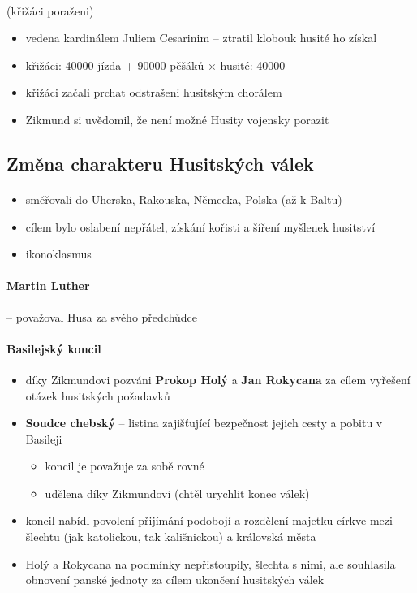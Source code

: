 \paragraph{} (křižáci poraženi)
\begin{itemize}
\item vedena kardinálem Juliem Cesarinim -- ztratil klobouk \ra husité ho získal
\item křižáci: 40000 jízda + 90000 pěšáků $\times$ husité: 40000
\item křižáci začali prchat odstrašeni husitským chorálem
\item[\ra] Zikmund si uvědomil, že není možné Husity vojensky porazit
\end{itemize}

\subsection{Změna charakteru Husitských válek}
\paragraph{}
\begin{itemize}
\item směřovali do Uherska, Rakouska, Německa, Polska (až k Baltu)
\item cílem bylo oslabení nepřátel, získání kořisti a šíření myšlenek husitství
\item ikonoklasmus
\end{itemize}

\paragraph{Martin Luther} -- považoval Husa za svého předchůdce

\paragraph{Basilejský koncil}
\begin{itemize}
\item díky Zikmundovi pozváni \textbf{Prokop Holý} a \textbf{Jan Rokycana} za cílem vyřešení otázek husitských požadavků
\item \textbf{Soudce chebský} -- listina zajišťující bezpečnost jejich cesty a pobitu v Basileji
\begin{itemize}
\item koncil je považuje za sobě rovné
\item udělena díky Zikmundovi (chtěl urychlit konec válek)
\end{itemize}
\item koncil nabídl povolení přijímání podobojí a rozdělení majetku církve mezi šlechtu (jak katolickou, tak kališnickou) a královská města 
\item Holý a Rokycana na podmínky nepřistoupily, šlechta s nimi, ale souhlasila \ra obnovení panské jednoty za cílem ukončení husitských válek
\end{itemize}


